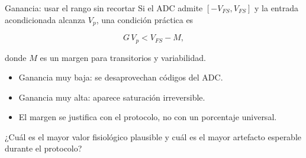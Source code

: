 \documentclass[
  ignorenonframetext,
  aspectratio=169,
  spanish,
  professionalfonts]{beamer}
\providecommand{\tightlist}{%
  \setlength{\itemsep}{0pt}\setlength{\parskip}{0pt}}
\begin{document}
\begin{frame}{Ganancia: usar el rango sin recortar}
\protect{}\label{ganancia-usar-el-rango-sin-recortar}
Si el ADC admite \([-V_{FS},V_{FS}]\) y la entrada acondicionada alcanza
\(V_{p}\), una condición práctica es

\[
G\,V_p < V_{FS}-M,
\]

donde \(M\) es un margen para transitorios y variabilidad.

\begin{itemize}
\tightlist
\item
  Ganancia muy baja: se desaprovechan códigos del ADC.
\item
  Ganancia muy alta: aparece saturación irreversible.
\item
  El margen se justifica con el protocolo, no con un porcentaje
  universal.
\end{itemize}

\begin{tcolorbox}[enhanced jigsaw, arc=.35mm, bottomrule=.15mm, bottomtitle=1mm, breakable, colback=white, colbacktitle=quarto-callout-tip-color!10!white, colframe=quarto-callout-tip-color-frame, coltitle=black, left=2mm, leftrule=.75mm, opacityback=0, opacitybacktitle=0.6, rightrule=.15mm, title={Pregunta de diseño}, titlerule=0mm, toprule=.15mm, toptitle=1mm]

¿Cuál es el mayor valor fisiológico plausible y cuál es el mayor
artefacto esperable durante el protocolo?

\end{tcolorbox}
\end{frame}
\end{document}
